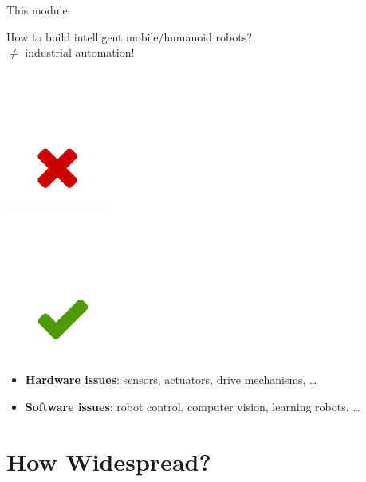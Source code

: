 \documentclass[compress]{beamer}
\begin{document}
\begin{frame}{This module}

    How to build intelligent mobile/humanoid robots?\\
    $\neq$ industrial automation!

    \begin{multicols}{2}

        \begin{center}
            \includegraphics[height=4.5cm]{no-industrial}

            \includegraphics[height=4.5cm]{yes-humanoid}
        \end{center}

    \end{multicols}

    \pause

    \begin{itemize}
        \item \textbf{Hardware issues}: sensors, actuators, drive mechanisms, \ldots{}
        \item \textbf{Software issues}: robot control, computer vision, learning robots, \ldots{}
    \end{itemize}

\end{frame}

\section{How Widespread?}

\end{document}
